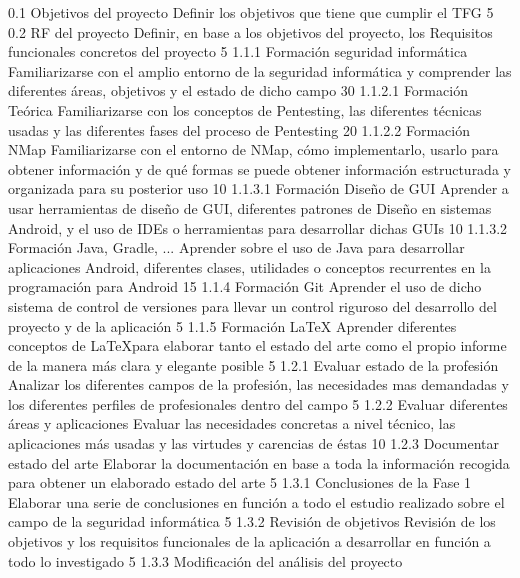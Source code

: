 \taskframe
	{0.1}
	{Objetivos del proyecto}
	{Definir los objetivos que tiene que cumplir el TFG}
	{5}
\taskframe
	{0.2}
	{RF del proyecto}
	{Definir, en base a los objetivos del proyecto, los Requisitos funcionales concretos del proyecto}
	{5}
\taskframe
	{1.1.1}
	{Formación seguridad informática}
	{Familiarizarse con el amplio entorno de la seguridad informática y comprender las diferentes áreas, objetivos y el estado de dicho campo}
	{30}
\taskframe
	{1.1.2.1}
	{Formación Teórica}
	{Familiarizarse con los conceptos de Pentesting, las diferentes técnicas usadas y las diferentes fases del proceso de Pentesting}
	{20}
\taskframe
	{1.1.2.2}
	{Formación NMap}
	{Familiarizarse con el entorno de NMap, cómo implementarlo, usarlo para obtener información y de qué formas se puede obtener información estructurada y organizada para su posterior uso}
	{10}
\taskframe
	{1.1.3.1}
	{Formación Diseño de GUI}
	{Aprender a usar herramientas de diseño de GUI, diferentes patrones de Diseño en sistemas Android, y el uso de IDEs o herramientas para desarrollar dichas GUIs}
	{10}
\taskframe
	{1.1.3.2}
	{Formación Java, Gradle, ...}
	{Aprender sobre el uso de Java para desarrollar aplicaciones Android, diferentes clases, utilidades o conceptos recurrentes en la programación para Android}
	{15}
\taskframe
	{1.1.4}
	{Formación Git}
	{Aprender el uso de dicho sistema de control de versiones para llevar un control riguroso del desarrollo del proyecto y de la aplicación}
	{5}
\taskframe
	{1.1.5}
	{Formación \LaTeX}
	{Aprender diferentes conceptos de \LaTeX para elaborar tanto el estado del arte como el propio informe de la manera más clara y elegante posible}
	{5}
\taskframe
	{1.2.1}
	{Evaluar estado de la profesión}
	{Analizar los diferentes campos de la profesión, las necesidades mas demandadas y los diferentes perfiles de profesionales dentro del campo}
	{5}
\taskframe
	{1.2.2}
	{Evaluar diferentes áreas y aplicaciones}
	{Evaluar las necesidades concretas a nivel técnico, las aplicaciones más usadas y las virtudes y carencias de éstas}
	{10}
\taskframe
	{1.2.3}
	{Documentar estado del arte}
	{Elaborar la documentación en base a toda la información recogida para obtener un elaborado estado del arte}
	{5}
\taskframe
	{1.3.1}
	{Conclusiones de la Fase 1}
	{Elaborar una serie de conclusiones en función a todo el estudio realizado sobre el campo de la seguridad informática}
	{5}
\taskframe
	{1.3.2}
	{Revisión de objetivos}
	{Revisión de los objetivos y los requisitos funcionales de la aplicación a desarrollar en función a todo lo investigado}
	{5}
\taskframe
	{1.3.3}
	{Modificación del análisis del proyecto}
